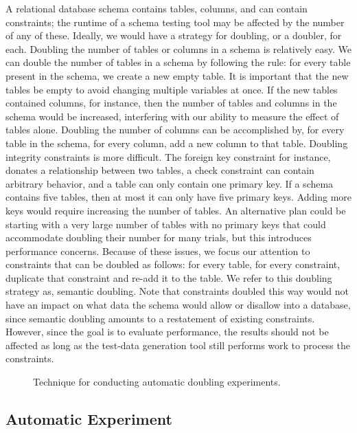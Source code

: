   A relational database schema contains tables, columns, and can contain
  constraints; the runtime of a schema testing tool may be affected by the
  number of any of these. Ideally, we would have a strategy for doubling,
  or a doubler, for each. Doubling the number of tables or columns in a
  schema is relatively easy.  We can double the number of tables in a schema
  by following the rule: for every table present in the schema, we create
  a new empty table. It is important that the new tables be empty to avoid
  changing multiple variables at once.  If the new tables contained
  columns, for instance, then the number of tables and columns in the schema
  would be increased, interfering with our ability to measure the effect of
  tables alone.  Doubling the number of columns can be accomplished by, for
  every table in the schema, for every column, add a new column to that table.
  Doubling integrity constraints is more difficult.  The foreign key
  constraint for instance, donates a relationship between two tables, a check
  constraint can contain arbitrary behavior, and a table can only contain one
  primary key.  If a schema contains five tables, then at most it can only
  have five primary keys.  Adding more keys would require increasing the
  number of tables.  An alternative plan could be starting with a very large
  number of tables with no primary keys that could accommodate doubling their
  number for many trials, but this introduces performance concerns.  Because
  of these issues, we focus our attention to constraints that can be doubled
  as follows: for every table, for every constraint, duplicate that
  constraint and re-add it to the table.  We refer to this doubling strategy
  as, semantic doubling.  Note that constraints doubled this way would not have
  an impact on what data the schema would allow or disallow into a database,
  since semantic doubling amounts to a restatement of existing constraints.
  However, since the goal is to evaluate performance, the results should not be
  affected as long as the test-data generation tool still performs work to
  process the constraints.



  \begin{figure*}
    
    \caption{Technique for conducting automatic doubling experiments.}
    \label{fig:doublingexp}
  \end{figure*}

  \subsection{Automatic Experiment}
  \label{subsec:experiment}

